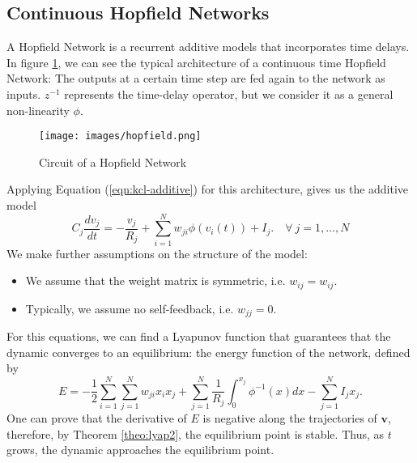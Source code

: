 \documentclass[oneside]{book}
\theoremstyle{definition}
\theoremstyle{plain}
\begin{document}
\subsection{Continuous Hopfield Networks}
A Hopfield Network is a recurrent additive models that incorporates time delays. In figure \ref{fig:hopfield}, we can see the typical architecture of a continuous time Hopfield Network: The outputs at a certain time step are fed again to the network as inputs. $z^{-1}$ represents the time-delay operator, but we consider it as a general non-linearity $\phi$.

\begin{figure}
    \centering
    \texttt{[image: images/hopfield.png]}
    \caption{Circuit of a Hopfield Network}
    \label{fig:hopfield}
\end{figure}
Applying Equation (\ref{eqn:kcl-additive})  for this architecture, gives us the additive model
\begin{equation}\label{eqn:hopfield-cont}
    C_j \frac{dv_j}{dt} = -\frac{v_j}{R_j} + \sum_{i=1}^Nw_{ji} \phi( v_i(t)) +I_j. \quad \forall\: j=1,...,N
\end{equation}
We make further assumptions on the structure of the model:
\begin{itemize}
    \item We assume that the weight matrix is symmetric, i.e. $w_{ij}=w_{ij}$.
    \item Typically, we assume no self-feedback, i.e. $w_{jj} =0$. 
\end{itemize}

For this equations, we can find a Lyapunov function that guarantees that the dynamic converges to an equilibrium: the energy function of the network, defined by
\begin{equation}\label{eqn:hopfield-energy}
    E = -\frac{1}{2}\sum_{i=1}^N\sum_{j=1}^N w_{ji}x_ix_j + \sum_{j=1}^N \frac{1}{R_j} \int_{0}^{x_j} \phi^{-1}(x)dx - \sum_{j=1}^N I_jx_j.
\end{equation}
One can prove that the derivative of $E$ is negative along the trajectories of $\mathbf{v}$, therefore, by Theorem \ref{theo:lyap2}, the equilibrium point is stable. 
Thus, as $t$ grows, the dynamic approaches the equilibrium point.
\end{document}
